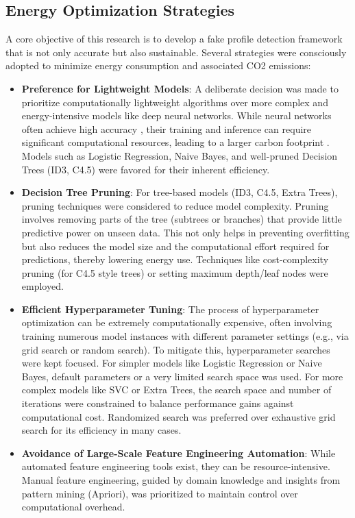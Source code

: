 \documentclass[conference]{IEEEtran}
\begin{document}
\subsection{Energy Optimization Strategies}
A core objective of this research is to develop a fake profile detection framework that is not only accurate but also sustainable. Several strategies were consciously adopted to minimize energy consumption and associated CO2 emissions:
\begin{itemize}
    \item \textbf{Preference for Lightweight Models}: A deliberate decision was made to prioritize computationally lightweight algorithms over more complex and energy-intensive models like deep neural networks. While neural networks often achieve high accuracy \cite{b6}, their training and inference can require significant computational resources, leading to a larger carbon footprint \cite{b4}. Models such as Logistic Regression, Naive Bayes, and well-pruned Decision Trees (ID3, C4.5) were favored for their inherent efficiency.
    \item \textbf{Decision Tree Pruning}: For tree-based models (ID3, C4.5, Extra Trees), pruning techniques were considered to reduce model complexity. Pruning involves removing parts of the tree (subtrees or branches) that provide little predictive power on unseen data. This not only helps in preventing overfitting but also reduces the model size and the computational effort required for predictions, thereby lowering energy use. Techniques like cost-complexity pruning (for C4.5 style trees) or setting maximum depth/leaf nodes were employed.
    \item \textbf{Efficient Hyperparameter Tuning}: The process of hyperparameter optimization can be extremely computationally expensive, often involving training numerous model instances with different parameter settings (e.g., via grid search or random search). To mitigate this, hyperparameter searches were kept focused. For simpler models like Logistic Regression or Naive Bayes, default parameters or a very limited search space was used. For more complex models like SVC or Extra Trees, the search space and number of iterations were constrained to balance performance gains against computational cost. Randomized search was preferred over exhaustive grid search for its efficiency in many cases.
    \item \textbf{Avoidance of Large-Scale Feature Engineering Automation}: While automated feature engineering tools exist, they can be resource-intensive. Manual feature engineering, guided by domain knowledge and insights from pattern mining (Apriori), was prioritized to maintain control over computational overhead.

\end{itemize}
\end{document}
